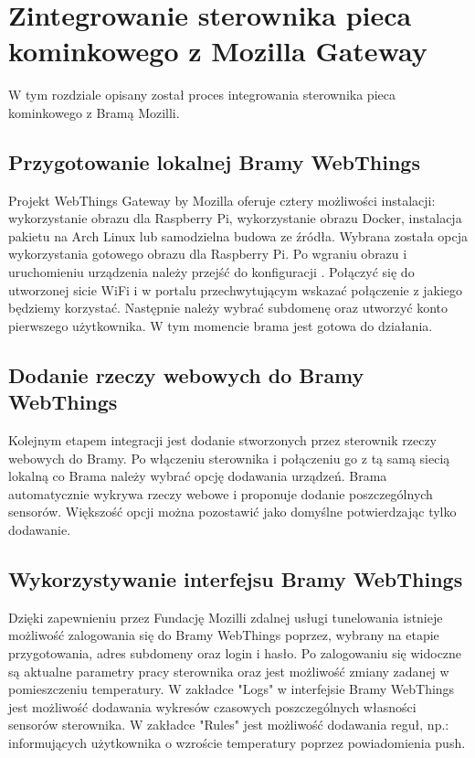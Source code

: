 \documentclass[11pt]{report}
\begin{document}
 \chapter{Zintegrowanie sterownika pieca kominkowego z Mozilla Gateway}
 W tym rozdziale opisany został proces integrowania sterownika pieca kominkowego z Bramą Mozilli.
 
 \section{Przygotowanie lokalnej Bramy WebThings}
  Projekt WebThings Gateway by Mozilla oferuje cztery możliwości instalacji: wykorzystanie obrazu dla Raspberry Pi, wykorzystanie obrazu Docker, instalacja pakietu na Arch Linux lub samodzielna budowa ze źródła. Wybrana została opcja wykorzystania gotowego obrazu dla Raspberry Pi.
  Po wgraniu obrazu i uruchomieniu urządzenia należy przejść do konfiguracji \cite{gatewaystarted2019}. Połączyć się do utworzonej sicie WiFi i w portalu przechwytującym wskazać połączenie z jakiego będziemy korzystać. Następnie należy wybrać subdomenę oraz utworzyć konto pierwszego użytkownika. W tym momencie brama jest gotowa do działania.

 \section{Dodanie rzeczy webowych do Bramy WebThings}
 Kolejnym etapem integracji jest dodanie stworzonych przez sterownik rzeczy webowych do Bramy. Po włączeniu sterownika i połączeniu go z tą samą siecią lokalną co Brama należy wybrać opcję dodawania urządzeń. Brama automatycznie wykrywa rzeczy webowe i proponuje dodanie poszczególnych sensorów. Większość opcji można pozostawić jako domyślne potwierdzając tylko dodawanie.
 
 \section{Wykorzystywanie interfejsu Bramy WebThings}
 Dzięki zapewnieniu przez Fundację Mozilli zdalnej usługi tunelowania istnieje możliwość zalogowania się do Bramy WebThings poprzez, wybrany na etapie przygotowania, adres subdomeny oraz login i hasło. Po zalogowaniu się widoczne są aktualne parametry pracy sterownika oraz jest możliwość zmiany zadanej w pomieszczeniu temperatury. W zakładce "Logs" w interfejsie Bramy WebThings jest możliwość dodawania wykresów czasowych poszczególnych własności sensorów sterownika. W zakładce "Rules" jest możliwość dodawania reguł, np.: informujących użytkownika o wzroście temperatury poprzez powiadomienia push.
 
\end{document}
